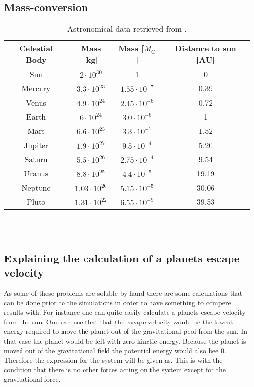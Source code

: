 \documentclass{article}
\begin{document}
\subsection{Mass-conversion} \label{app:mass}


    \begin{table}[H]
        \centering
        \caption{Astronomical data retrieved from \cite{solarsystemdata}. }
        \vspace{2mm}
        \label{tab:mass}
        \begin{tabular}{|c|c|c|c|}
            \hline
            Celestial Body & Mass [kg] & Mass [$M_{\odot}$] & Distance to sun [AU]\\
            \hline \hline
            Sun     & $ 2    \cdot10^{30} $ & 1                    & 0 \\
            Mercury & $ 3.3  \cdot10^{23} $ & $1.65 \cdot 10^{-7}$ & 0.39 \\
            Venus   & $ 4.9  \cdot10^{24} $ & $2.45 \cdot 10^{-6}$ & 0.72 \\
            Earth   & $ 6    \cdot10^{24} $ & $3.0 \cdot 10^{-6}$  & 1 \\
            Mars    & $ 6.6  \cdot10^{23} $ & $3.3 \cdot 10^{-7}$  & 1.52 \\
            Jupiter & $ 1.9  \cdot10^{27} $ & $9.5 \cdot 10^{-4}$  & 5.20 \\
            Saturn  & $ 5.5  \cdot10^{26} $ & $2.75 \cdot 10^{-4}$ & 9.54 \\
            Uranus  & $ 8.8  \cdot10^{25} $ & $4.4 \cdot 10^{-5}$  & 19.19 \\
            Neptune & $ 1.03 \cdot10^{26} $ & $5.15 \cdot 10^{-5}$ & 30.06 \\
            Pluto   & $ 1.31 \cdot10^{22} $ & $6.55 \cdot 10^{-9}$ & 39.53 \\
            \hline
        \end{tabular} \\
        \hspace{0pt}\\
    \end{table}

\subsection{Explaining the calculation of a planets escape velocity} \label{sec:escapevelocity}

    As some of these problems are soluble by hand there are some calculations that can be done prior to the simulations in order to have something to compere results with. For instance one can quite easily calculate a planets escape velocity from the sun. One can use that that the escape velocity would be the lowest energy required to move the planet out of the gravitational pool from the sun. In that case the planet would be left with zero kinetic energy. Because the planet is moved out of the gravitational field the potential energy would also bee 0. Therefore the expression for the system will be given as. This is with the condition that there is no other forces acting on the system except for the gravitational force.   \\
\end{document}
